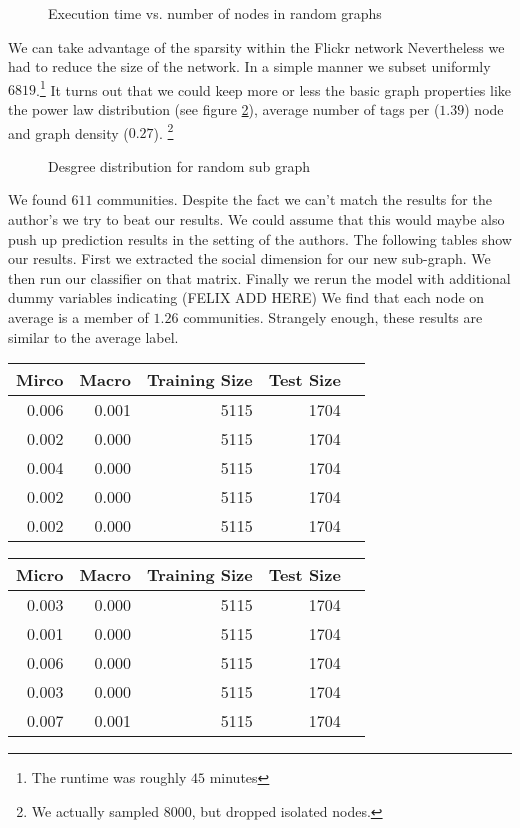 \documentclass[11pt,letterpaper]{article}
\begin{document}
\begin{figure}[H]
	
	\caption{Execution time vs. number of nodes in random graphs}
	\label{fig:fig2}
\end{figure}

We can take advantage of the sparsity within the Flickr network  Nevertheless we had to reduce the size of the network. In a simple manner we subset uniformly $6819$.\footnote{The runtime was roughly $45$ minutes} It turns out that we could keep more or less the basic graph properties like the power law distribution (see figure \ref{fig:fig3}), average number of tags per ($1.39$) node and graph density ($0.27$). \footnote{We actually sampled $8000$, but dropped isolated nodes.}

\begin{figure}[H]
	
	\caption{Desgree distribution for random sub graph}
	\label{fig:fig3}
\end{figure}

We found $611$ communities. Despite the fact we can't match the results for the author's we try to beat our results. We could assume that this would maybe also push up prediction results in the setting of the authors. The following tables show our results. First we extracted the social dimension for our new sub-graph. We then run our classifier on that matrix. Finally we rerun the model with additional dummy variables indicating (FELIX ADD HERE) We find that each node on average is a member of $1.26$ communities. Strangely enough, these results are similar to the average label. 


\begin{table}[ht]
	\centering
	\begin{tabular}{rrrrr}
		\hline
		Mirco & Macro & Training Size & Test Size \\ 
		\hline
		0.006 & 0.001 & 5115 & 1704 \\ 
		0.002 & 0.000 & 5115 & 1704 \\ 
		0.004 & 0.000 & 5115 & 1704 \\ 
		0.002 & 0.000 & 5115 & 1704 \\ 
		0.002 & 0.000 & 5115 & 1704 \\ 
		\hline
	\end{tabular}
\end{table}



\begin{table}[ht]
	\centering
	\begin{tabular}{rrrrr}
		\hline
		Micro & Macro & Training Size & Test Size\\ 
		\hline
		0.003 & 0.000 & 5115 & 1704 \\ 
		0.001 & 0.000 & 5115 & 1704 \\ 
		0.006 & 0.000 & 5115 & 1704 \\ 
		0.003 & 0.000 & 5115 & 1704 \\ 
		0.007 & 0.001 & 5115 & 1704 \\ 
		\hline
	\end{tabular}
\end{table}
\end{document}
